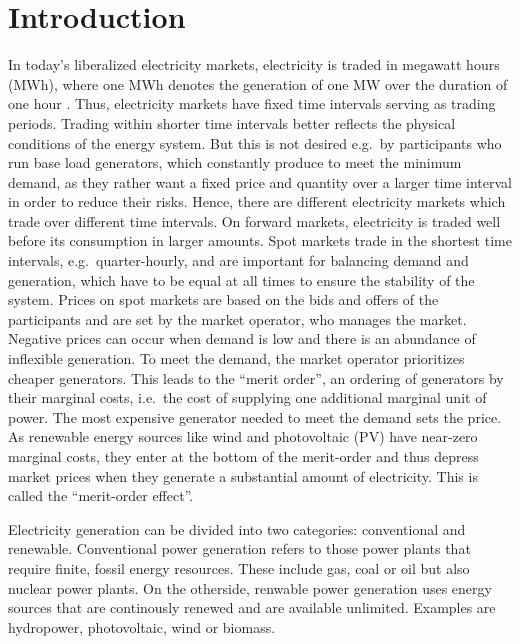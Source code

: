 \documentclass{article}
\begin{document}
\section{Introduction}
In today's liberalized electricity markets, electricity is traded in megawatt hours (MWh), where one MWh denotes the generation of one MW over the duration of one hour \citep{markets_for_electrical_energy}.
Thus, electricity markets have fixed time intervals serving as trading periods.
Trading within shorter time intervals better reflects the physical conditions of the energy system.
But this is not desired e.g.\ by participants who run base load generators, which constantly produce to meet the minimum demand, as they rather want a fixed price and quantity over a larger time interval in order to reduce their risks.
Hence, there are different electricity markets which trade over different time intervals.
On forward markets, electricity is traded well before its consumption in larger amounts.
Spot markets trade in the shortest time intervals, e.g.\ quarter-hourly, and are important for balancing demand and generation, which have to be equal at all times to ensure the stability of the system.
Prices on spot markets are based on the bids and offers of the participants and are set by the market operator, who manages the market.
Negative prices can occur when demand is low and there is an abundance of inflexible generation.
To meet the demand, the market operator prioritizes cheaper generators.
This leads to the \enquote{merit order}, an ordering of generators by their marginal costs, i.e.\ the cost of supplying one additional marginal unit of power.
The most expensive generator needed to meet the demand sets the price.
As renewable energy sources like wind and photovoltaic (PV) have near-zero marginal costs, they enter at the bottom of the merit-order and thus depress market prices when they generate a substantial amount of electricity.
This is called the \enquote{merit-order effect}.

Electricity generation can be divided into two categories: conventional and renewable. Conventional power generation refers to those power plants that require finite, fossil energy resources. These include gas, coal or oil but also nuclear power plants. On the otherside, renwable power generation uses energy sources that are continously renewed and are available unlimited. Examples are hydropower, photovoltaic, wind or biomass.
\end{document}
